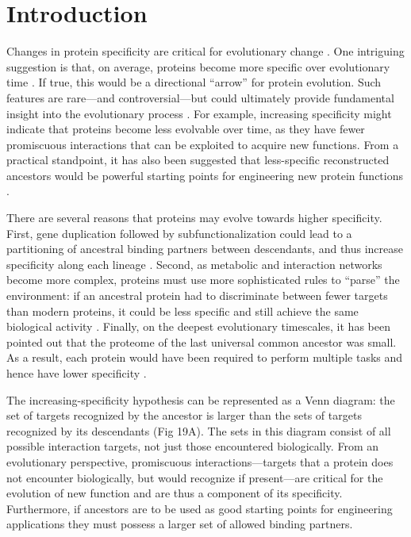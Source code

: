 \section{Introduction}
Changes in protein specificity are critical for evolutionary change
\citep{carroll_evolution_2008,khersonsky_enzyme_2010,soskine_mutational_2010,kanzaki_arms_2012,reinke_networks_2013,kaltenbach_dynamics_2014,clifton_ancestral_2016,alhindi_protein_2017}.
One intriguing suggestion is that, on average, proteins become more
specific over evolutionary time \citep{jensen_enzyme_1976,copley_toward_2012,wheeler_thermostability_2016}.
If true, this would be a directional ``arrow'' for protein evolution\citep{gaucher_palaeotemperature_2008,mannige_universal_2012,risso_thermostable_2014,wheeler_thermostability_2016}.
Such features are rare---and controversial---but could ultimately provide
fundamental insight into the evolutionary process \citep{williams_assessing_2006,wheeler_thermostability_2016}.
For example, increasing specificity might indicate that proteins become
less evolvable over time, as they have fewer promiscuous interactions
that can be exploited to acquire new functions. From a practical standpoint,
it has also been suggested that less-specific reconstructed ancestors
would be powerful starting points for engineering new protein functions
\citep{risso_hyperstability_2013}.

There are several reasons that proteins may evolve towards higher
specificity. First, gene duplication followed by subfunctionalization
could lead to a partitioning of ancestral binding partners between
descendants, and thus increase specificity along each lineage \citep{hittinger_gene_2007,eick_evolution_2012,clifton_ancestral_2016,alhindi_protein_2017}.
Second, as metabolic and interaction networks become more complex,
proteins must use more sophisticated rules to ``parse'' the environment:
if an ancestral protein had to discriminate between fewer targets
than modern proteins, it could be less specific and still achieve
the same biological activity \citep{eick_evolution_2012}. Finally,
on the deepest evolutionary timescales, it has been pointed out that
the proteome of the last universal common ancestor was small. As a
result, each protein would have been required to perform multiple
tasks and hence have lower specificity \citep{jensen_enzyme_1976,copley_toward_2012}. 

The increasing-specificity hypothesis can be represented as a Venn
diagram: the set of targets recognized by the ancestor is larger than
the sets of targets recognized by its descendants (Fig 19A). The sets
in this diagram consist of all possible interaction targets, not just
those encountered biologically. From an evolutionary perspective,
promiscuous interactions---targets that a protein does not encounter
biologically, but would recognize if present---are critical for the
evolution of new function and are thus a component of its specificity.
Furthermore, if ancestors are to be used as good starting points for
engineering applications they must possess a larger set of allowed
binding partners. 

